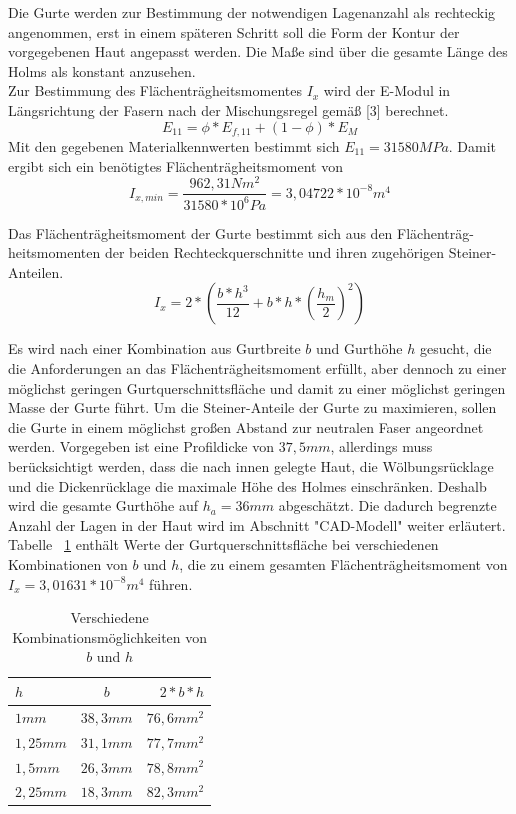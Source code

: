 \noindent Die Gurte werden zur Bestimmung der notwendigen Lagenanzahl als rechteckig angenommen, erst in einem späteren Schritt soll die Form der Kontur der vorgegebenen Haut angepasst werden. Die Maße sind über die gesamte Länge des Holms als konstant anzusehen.\\
Zur Bestimmung des Flächenträgheitsmomentes $ I_{x} $ wird der E-Modul in Längsrichtung der Fasern nach der Mischungsregel gemäß [3] berechnet.\\
\begin{equation}
 E_{11}=  \phi*E_{f,11}+\left( 1-\phi \right) * E_{M}
\end{equation}
Mit den gegebenen Materialkennwerten bestimmt sich $ E_{11} = 31580 MPa $. Damit ergibt sich ein benötigtes Flächenträgheitsmoment von 
\begin{equation}
	I_{x,min} = \frac{962,31Nm^{2}}{31580*10^{6}Pa} =3,04722 * 10^{-8} m^{4}
\end{equation}

\noindent Das Flächenträgheitsmoment der Gurte bestimmt sich aus den Flächenträg-heitsmomenten der beiden Rechteckquerschnitte und ihren zugehörigen Steiner-Anteilen.
\begin{equation}
	\label{Ix}
	I_{x}=2*\left(\frac{b*h^{3}}{12}+b*h*\left(\frac{h_{m}}{2}\right)^{2}\right)
\end{equation}

\noindent Es wird nach einer Kombination aus Gurtbreite $ b $ und Gurthöhe $ h $ gesucht, die die Anforderungen an das Flächenträgheitsmoment erfüllt, aber dennoch zu einer möglichst geringen Gurtquerschnittsfläche und damit zu einer möglichst geringen Masse der Gurte führt. Um die Steiner-Anteile der Gurte zu maximieren, sollen die Gurte in einem möglichst großen Abstand zur neutralen Faser angeordnet werden. Vorgegeben ist eine Profildicke von $ 37,5mm $, allerdings muss berücksichtigt werden, dass die nach innen gelegte Haut, die Wölbungsrücklage und die Dickenrücklage die maximale Höhe des Holmes einschränken. Deshalb wird die gesamte Gurthöhe auf $ h_{a}=36mm $ abgeschätzt. Die dadurch begrenzte Anzahl der Lagen in der Haut wird im Abschnitt "CAD-Modell" weiter erläutert.\\ 

\noindent Tabelle ~\ref{bh} enthält Werte der Gurtquerschnittsfläche bei verschiedenen Kombinationen von $ b $ und $ h $, die zu einem gesamten Flächenträgheitsmoment von $ I_{x} = 3,01631 * 10^{-8} m^{4} $ führen.\\
\begin{table}[h]
	\caption{Verschiedene Kombinationsmöglichkeiten von $ b $ und $ h $}
	\label{bh}
	\begin{center}
		\begin{tabular}{l|c|r}
			$h$&$b$&$2*b*h$\\
			\hline
			$1mm$&$38,3mm$&$76,6mm^{2}$\\
			$1,25mm$&$31,1mm$&$77,7mm^{2}$\\
			$1,5mm$&$26,3mm$&$78,8mm^{2}$\\
			$2,25mm$&$18,3mm$&$82,3mm^{2}$\\
		\end{tabular}
	\end{center}
\end{table}

